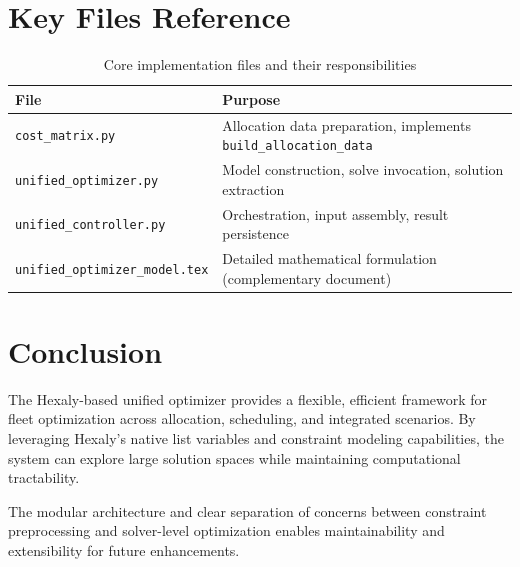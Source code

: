 \documentclass[11pt,a4paper]{article}
\begin{document}
\section{Key Files Reference}

\begin{table}[h]
\centering
\begin{tabular}{|l|p{8cm}|}
\hline
\textbf{File} & \textbf{Purpose} \\
\hline
\texttt{cost\_matrix.py} & Allocation data preparation, implements \texttt{build\_allocation\_data} \\
\hline
\texttt{unified\_optimizer.py} & Model construction, solve invocation, solution extraction \\
\hline
\texttt{unified\_controller.py} & Orchestration, input assembly, result persistence \\
\hline
\texttt{unified\_optimizer\_model.tex} & Detailed mathematical formulation (complementary document) \\
\hline
\end{tabular}
\caption{Core implementation files and their responsibilities}
\end{table}

\section{Conclusion}

The Hexaly-based unified optimizer provides a flexible, efficient framework for fleet optimization across allocation, scheduling, and integrated scenarios. By leveraging Hexaly's native list variables and constraint modeling capabilities, the system can explore large solution spaces while maintaining computational tractability.

The modular architecture and clear separation of concerns between constraint preprocessing and solver-level optimization enables maintainability and extensibility for future enhancements.
\end{document}
